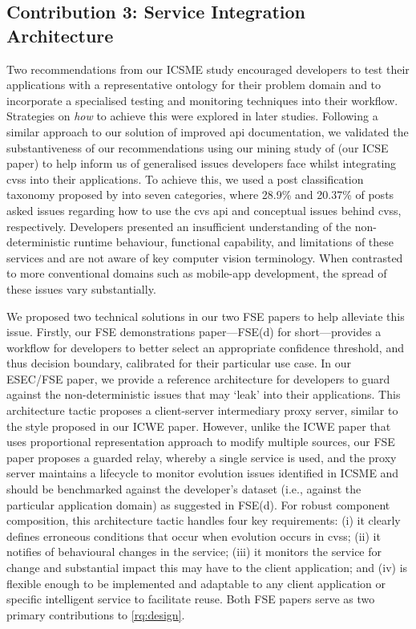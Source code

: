 \subsection{Contribution 3: Service Integration Architecture}

Two recommendations from our ICSME study encouraged developers to test their applications with a representative ontology for their problem domain and to incorporate a specialised testing and monitoring techniques into their workflow. Strategies on \textit{how} to achieve this were explored in later studies.  Following a similar approach to our solution of improved \gls{api} documentation, we validated the substantiveness of our recommendations using our mining study of  (our ICSE paper) to help inform us of generalised issues developers face whilst integrating \glspl{cvs} into their applications. To achieve this, we used a  post classification taxonomy proposed by \citet{Beyer:2018fm} into seven categories, where 28.9\% and 20.37\% of posts asked issues regarding how to use the \gls{cvs} \gls{api} and conceptual issues behind \glspl{cvs}, respectively. Developers presented an insufficient understanding of the non-deterministic runtime behaviour, functional capability, and limitations of these services and are not aware of key computer vision terminology. When contrasted to more conventional domains such as mobile-app development, the spread of these issues vary substantially.

We proposed two technical solutions in our two FSE papers to help alleviate this issue. Firstly, our FSE demonstrations paper---FSE(d) for short---provides a workflow for developers to better select an appropriate confidence threshold, and thus decision boundary, calibrated for their particular use case. In our ESEC/FSE paper, we provide a reference architecture for developers to guard against the non-deterministic issues that may `leak' into their applications. This architecture tactic proposes a client-server intermediary proxy server, similar to the style proposed in our ICWE paper. However, unlike the ICWE paper that uses proportional representation approach to modify multiple sources, our FSE paper proposes a guarded relay, whereby a single service is used, and the proxy server maintains a lifecycle to monitor evolution issues identified in ICSME and should be benchmarked against the developer's dataset (i.e., against the particular application domain) as suggested in FSE(d). For robust component composition, this architecture tactic handles four key requirements: (i) it clearly defines erroneous conditions that occur when evolution occurs in \glspl{cvs}; (ii) it notifies of behavioural changes in the service; (iii) it monitors the service for change and substantial impact this may have to the client application; and (iv) is flexible enough to be implemented and adaptable to any client application or specific intelligent service to facilitate reuse. Both FSE papers serve as two primary contributions to \ref{rq:design}.

